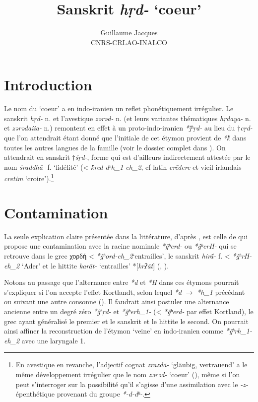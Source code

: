 \documentclass{article}
\newcommand{\ipa}[1]{{\phon\textit{#1}}}
\newcommand{\grec}[1]{{\mleccha #1}}
\begin{document}
 
\title{Sanskrit \ipa{hṛd-} `coeur'}
\author{Guillaume Jacques\\ CNRS-CRLAO-INALCO}
\maketitle
\section*{Introduction}
Le nom du `coeur' a en indo-iranien un reflet phonétiquement irrégulier. Le sanskrit \ipa{hṛd-} n. et l'avestique \ipa{zərəd-} n. (et leurs variantes thématiques \ipa{hṛdaya-} n. et \ipa{zərədaiia-} n.) remontent en effet à un proto-indo-iranien \ipa{*j́ʰṛd-} au lieu du $\dagger$\ipa{cṛd-} que l'on attendrait étant donné que l'initiale de cet étymon provient de \ipa{*ḱ} dans toutes les autres langues de la famille (voir le dossier complet dans \citealt[417-423]{wodtko08NIL}). On attendrait en sanskrit $\dagger$\ipa{śṛd-}, forme qui est d'ailleurs  indirectement attestée par le nom \ipa{śraddhā-} f. `fidélité' (< \ipa{k̂red-dʰh_1-eh_2}, cf latin \ipa{crēdere} et vieil irlandais \ipa{cretim} `croire').\footnote{En avestique en revanche, l'adjectif cognat \ipa{zrazdā-} `gläubig, vertrauend' a le même développement irrégulier que le nom \ipa{zərəd-} `coeur' (\citealt[663]{mayrhofer92ewa}), même si l'on peut s'interroger sur la possibilité qu'il s'agisse d'une assimilation avec le \ipa{-z-} épenthétique provenant du groupe \ipa{*-d-dʰ-}. }

\section{Contamination} \label{sec:hira}
La seule explication claire présentée dans la littérature, d'après \citet[420]{wodtko08NIL}, est celle de \citet{szemerenyi70heart} qui propose une contamination avec la racine nominale \ipa{*ĝʰerd-} ou \ipa{*ĝʰerH-} qui se retrouve dans le grec \grec{χορδή} < \ipa{*ĝʰord-eh_2}`entrailles', le sanskrit \ipa{hirā́-} f. < \ipa{*ĝʰrH-eh_2} `Ader' et le hittite \ipa{karāt-} `entrailles' *[\ipa{krʔāt}] (\citealt[208]{schrijver91laryngeals}, \citealt[446]{kloekhorst08edhil}).

Notons au passage que l'alternance entre \ipa{*d} et \ipa{*H} dans ces étymons pourrait s'expliquer si l'on accepte l'effet Kortlandt, selon lequel \ipa{*d} $\rightarrow$ \ipa{*h_1} précédant ou suivant  une autre consonne (\citealt{kortlandt83numerals, garnier14kortlandt}). Il faudrait ainsi postuler une alternance ancienne entre un degré zéro \ipa{*ĝʰṛd-} et  \ipa{*ĝʰerh_1-} (< \ipa{*ĝʰerd-} par effet Kortland), le grec ayant généralisé le premier et le sanskrit et le hittite le second. On pourrait ainsi affiner la reconstruction de l'étymon `veine' en indo-iranien comme \ipa{*ĝʰrh_1-eh_2} avec une laryngale 1.
\end{document}
